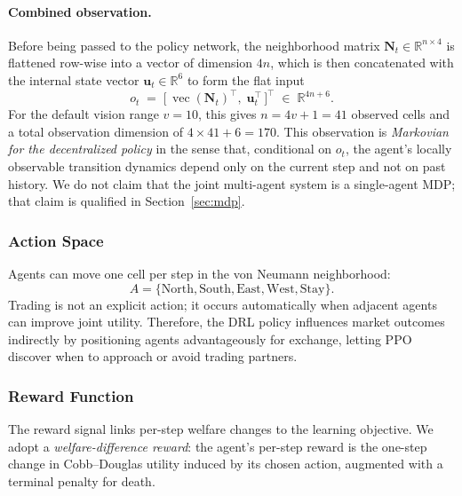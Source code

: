 \documentclass[pdflatex,sn-mathphys-num]{sn-jnl}%
\theoremstyle{thmstyleone}%
\theoremstyle{thmstyletwo}%
\theoremstyle{thmstylethree}%
\begin{document}
\paragraph{Combined observation.}
Before being passed to the policy network, the neighborhood matrix $\mathbf{N}_t \in \mathbb{R}^{n \times 4}$ is flattened row-wise into a vector of dimension $4n$, which is then concatenated with the internal state vector $\mathbf{u}_t \in \mathbb{R}^{6}$ to form the flat input
\[
o_t \;=\; \bigl[\,\operatorname{vec}(\mathbf{N}_t)^\top,\; \mathbf{u}_t^\top\,\bigr]^\top \;\in\; \mathbb{R}^{4n + 6}.
\]
For the default vision range $v = 10$, this gives $n = 4v + 1 = 41$ observed cells and a total observation dimension of $4 \times 41 + 6 = 170$.
This observation is \emph{Markovian for the decentralized policy} in the sense that, conditional on $o_t$, the agent's locally observable transition dynamics depend only on the current step and not on past history.
We do not claim that the joint multi-agent system is a single-agent MDP; that claim is qualified in Section~\ref{sec:mdp}.

\subsubsection{Action Space}
Agents can move one cell per step in the von Neumann neighborhood:
\[
A=\{\text{North},\text{South},\text{East},\text{West},\text{Stay}\}.
\]
Trading is not an explicit action; it occurs automatically when adjacent agents can improve joint utility.  
Therefore, the DRL policy influences market outcomes indirectly by positioning agents advantageously for exchange, letting PPO discover when to approach or avoid trading partners.

\subsubsection{Reward Function}

The reward signal links per-step welfare changes to the learning objective.  
We adopt a \emph{welfare-difference reward}: the agent's per-step reward is the one-step change in Cobb--Douglas utility induced by its chosen action, augmented with a terminal penalty for death.
\end{document}
